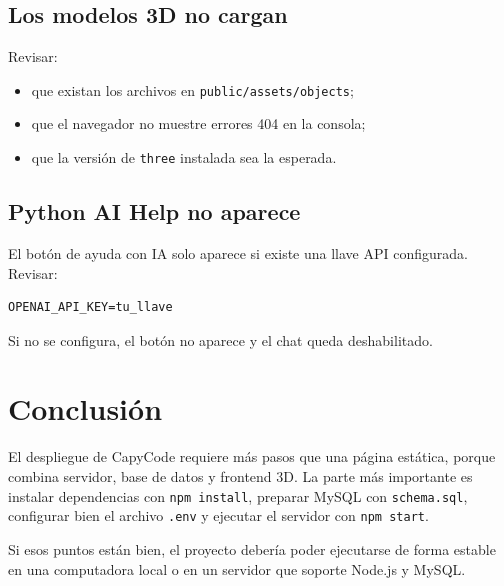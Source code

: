 \documentclass[12pt,letterpaper]{article}
\begin{document}
\subsection{Los modelos 3D no cargan}

Revisar:

\begin{itemize}
  \item que existan los archivos en \texttt{public/assets/objects};
  \item que el navegador no muestre errores 404 en la consola;
  \item que la versión de \texttt{three} instalada sea la esperada.
\end{itemize}

\subsection{Python AI Help no aparece}

El botón de ayuda con IA solo aparece si existe una llave API configurada. Revisar:

\begin{lstlisting}[style=comandos]
OPENAI_API_KEY=tu_llave
\end{lstlisting}

Si no se configura, el botón no aparece y el chat queda deshabilitado.

\section{Conclusión}

El despliegue de CapyCode requiere más pasos que una página estática, porque combina servidor, base de datos y frontend 3D. La parte más importante es instalar dependencias con \texttt{npm install}, preparar MySQL con \texttt{schema.sql}, configurar bien el archivo \texttt{.env} y ejecutar el servidor con \texttt{npm start}.

Si esos puntos están bien, el proyecto debería poder ejecutarse de forma estable en una computadora local o en un servidor que soporte Node.js y MySQL.
\end{document}
